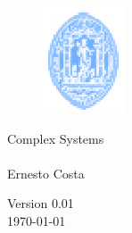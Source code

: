 \begin{titlepage}

\vspace*{3.5cm}
\begin{figure}[htbp] %
   \centering
   \includegraphics[scale=2.0]{front_page/timbre.eps} 
\end{figure}

\vspace*{2.0cm}

 
\begin{flushright}
\LARGE Complex Systems\\{\color{red}{Course Notes}}\\
 \vspace*{2cm} Ernesto Costa 
\end{flushright}


\begin{center}
 Version 0.01\\
\today
\end{center}
\end{titlepage}

